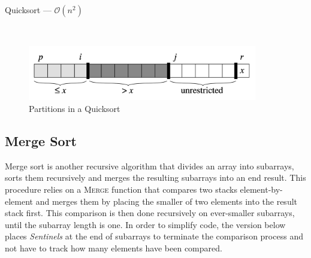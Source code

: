 \begin{algorithm}[H]
	\caption{Quicksort --- \( \mathcal{O}(n^2) \) }\label{alg:quick}
	\begin{algorithmic}
		\EndIf{}	
		\EndFunction{} \\
		 
		 
		 
		 
		  
		\EndIf{}
		\EndFor{}
		 
		\EndFunction{}
	\end{algorithmic}
\end{algorithm}

\begin{figure}[H]
	\centering
	\includegraphics[width=10cm]{partitions}
	\caption{Partitions in a Quicksort}\label{fig:quick}
\end{figure}

\subsection{Merge Sort}

Merge sort is another recursive algorithm that divides an array into subarrays, sorts them recursively and merges the resulting subarrays into an end result. This procedure relies on a \textsc{Merge} function that compares two stacks element-by-element and merges them by placing the smaller of two elements into the result stack first. This comparison is then done recursively on ever-smaller subarrays, until the subarray length is one. In order to simplify code, the version below places \emph{Sentinels} at the end of subarrays to terminate the comparison process and not have to track how many elements have been compared.

